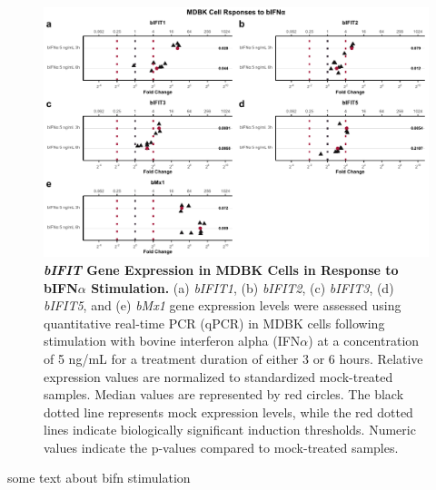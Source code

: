 \begin{figure}
    \centering
    \includegraphics[width=1\linewidth]{07. Chapter 2/Figs/02. Induction/01. mdbk_treat_bifna.pdf}
    \caption[\textit{bIFIT} Gene Expression in MDBK Cells in Response to bIFN\(\alpha\) Stimulation.]{\textbf{\textit{bIFIT} Gene Expression in MDBK Cells in Response to bIFN\(\alpha\) Stimulation.} (a) \textit{bIFIT1}, (b) \textit{bIFIT2}, (c) \textit{bIFIT3}, (d) \textit{bIFIT5}, and (e) \textit{bMx1} gene expression levels were assessed using quantitative real-time PCR (qPCR) in MDBK cells following stimulation with bovine interferon alpha (IFN\(\alpha\)) at a concentration of 5 ng/mL for a treatment duration of either 3 or 6 hours. Relative expression values are normalized to standardized mock-treated samples. Median values are represented by red circles. The black dotted line represents mock expression levels, while the red dotted lines indicate biologically significant induction thresholds. Numeric values indicate the p-values compared to mock-treated samples.}
    \label{fig:MDBK responses to bIFNa}
\end{figure}


some text about bifn stimulation

